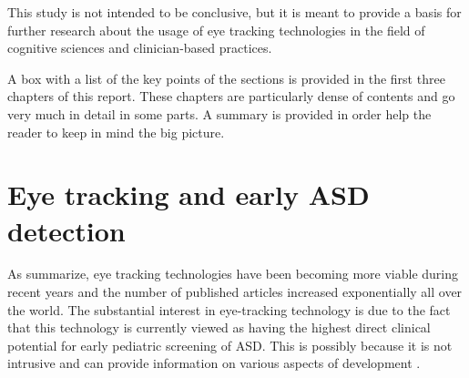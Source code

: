 This study is not intended to be conclusive, but it is meant to provide a basis for further research about the usage of eye tracking technologies in the field of cognitive sciences and clinician-based practices.

A box with a list of the key points of the sections is provided in the first three chapters of this report. These chapters are particularly dense of contents and go very much in detail in some parts. A summary is provided in order help the reader to keep in mind the big picture.


\section{Eye tracking and early ASD detection}
\label{sec:earlyASD}

\newline


As \cite{bolte2016detection} summarize, eye tracking technologies have been becoming more viable during recent years and the number of published articles increased exponentially all over the world. The substantial interest in eye-tracking technology is due to the fact that this technology is currently viewed as having the highest direct clinical potential for early pediatric screening of ASD. This is possibly because it is not intrusive and can provide information on various aspects of development  \citep{bolte2016detection,falck-ytter2013eyetrackingASD,subrahmaniam2013animation,sasson2012children}.

